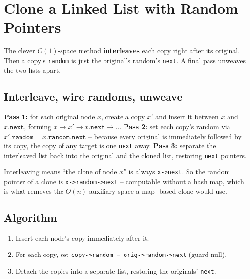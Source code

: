 \section{Clone a Linked List with Random Pointers}
\label{sec:ll-clone-random}


\begin{patternbox}
The clever $O(1)$-space method \textbf{interleaves} each copy right after
its original. Then a copy's \texttt{random} is just the original's random's
\texttt{next}. A final pass unweaves the two lists apart.
\end{patternbox}

\subsection*{Interleave, wire randoms, unweave}

\textbf{Pass 1:} for each original node $x$, create a copy $x'$ and insert it
between $x$ and $x.\texttt{next}$, forming
$x\to x'\to x.\texttt{next}\to\ldots$ \textbf{Pass 2:} set each copy's random
via $x'.\texttt{random}=x.\texttt{random}.\texttt{next}$ -- because every
original is immediately followed by its copy, the copy of any target is one
\texttt{next} away. \textbf{Pass 3:} separate the interleaved list back into
the original and the cloned list, restoring \texttt{next} pointers.

\begin{ideabox}
Interleaving means ``the clone of node $x$'' is always \texttt{x->next}. So
the random pointer of a clone is \texttt{x->random->next} -- computable
without a hash map, which is what removes the $O(n)$ auxiliary space a map-
based clone would use.
\end{ideabox}

\subsection*{Algorithm}

\begin{enumerate}
  \item Insert each node's copy immediately after it.
  \item For each copy, set \texttt{copy->random = orig->random->next} (guard
        null).
  \item Detach the copies into a separate list, restoring the originals'
        \texttt{next}.
\end{enumerate}

